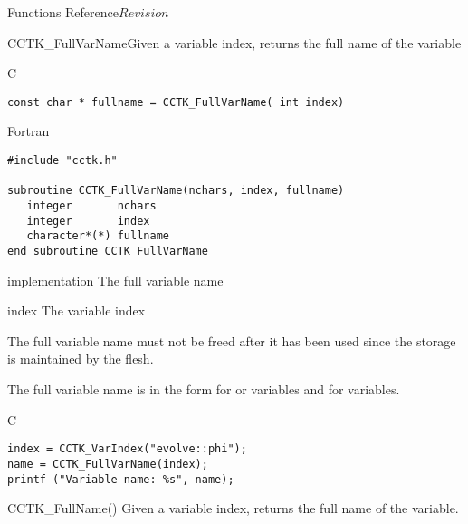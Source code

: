 \begin{cactuspart}{ Functions Reference}{}{$Revision$}
\begin{FunctionDescription}{CCTK\_FullVarName}{Given a variable index, returns the full name of the variable}
\label{CCTK-FullVarName}
\begin{SynopsisSection}
\begin{Synopsis}{C}
\begin{verbatim}const char * fullname = CCTK_FullVarName( int index)\end{verbatim}
\end{Synopsis}
\begin{Synopsis}{Fortran}
\begin{verbatim}
#include "cctk.h"

subroutine CCTK_FullVarName(nchars, index, fullname)
   integer       nchars
   integer       index
   character*(*) fullname
end subroutine CCTK_FullVarName
\end{verbatim}
\end{Synopsis}
\end{SynopsisSection}
\begin{ParameterSection}
\begin{Parameter}{implementation}
The full variable name
\end{Parameter}
\begin{Parameter}{index}
The variable index
\end{Parameter}
\end{ParameterSection}
\begin{Discussion}
The full variable name must not be freed after it has been used since the
storage is maintained by the flesh.

The full variable name is in the form  for
 or  variables and  for
 variables.
\end{Discussion}
\begin{ExampleSection}
\begin{Example}{C}
\begin{verbatim}
index = CCTK_VarIndex("evolve::phi");
name = CCTK_FullVarName(index);
printf ("Variable name: %s", name);
\end{verbatim}
\end{Example}
\end{ExampleSection}
\begin{SeeAlsoSection}
\begin{SeeAlso}{CCTK\_FullName()}
Given a variable index, returns the full name of the variable.
\end{SeeAlso}
\end{SeeAlsoSection}
\end{FunctionDescription}




\end{cactuspart}
